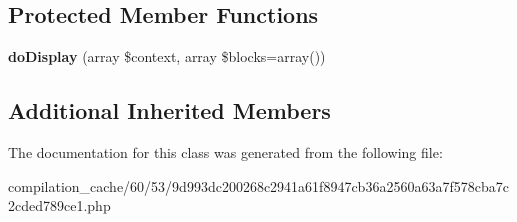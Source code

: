 \subsection*{Protected Member Functions}
\begin{DoxyCompactItemize}
\item 
\hypertarget{class_____twig_template__60539d993dc200268c2941a61f8947cb36a2560a63a7f578cba7c2cded789ce1_adb62b7c226e07d30f836ed16158d924f}{}{\bfseries do\+Display} (array \$context, array \$blocks=array())\label{class_____twig_template__60539d993dc200268c2941a61f8947cb36a2560a63a7f578cba7c2cded789ce1_adb62b7c226e07d30f836ed16158d924f}

\end{DoxyCompactItemize}
\subsection*{Additional Inherited Members}


The documentation for this class was generated from the following file\+:\begin{DoxyCompactItemize}
\item 
compilation\+\_\+cache/60/53/9d993dc200268c2941a61f8947cb36a2560a63a7f578cba7c2cded789ce1.\+php\end{DoxyCompactItemize}
